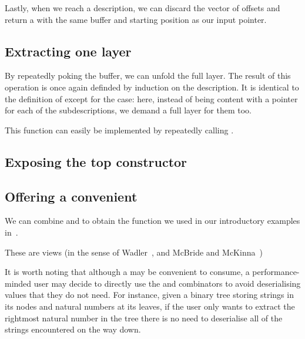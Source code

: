 
Lastly, when we reach a  description, we can discard the
vector of offsets and return a  with the same buffer
and starting position as our input pointer.

\subsection{Extracting one layer}

By repeatedly poking the buffer, we can unfold the full layer.
The result of this operation is once again definded by induction
on the description. It is identical to the definition of
 except for the  case:
here, instead of being content with a pointer for each of the
subdescriptions, we demand a full layer for them too.


This function can easily be implemented by repeatedly calling
.


\subsection{Exposing the top constructor}





\subsection{Offering a convenient }

We can combine  and  to obtain
the  function we used in our introductory examples
in~.



These are views
(in the sense of Wadler~\cite{DBLP:conf/popl/Wadler87},
and McBride and McKinna~\cite{DBLP:journals/jfp/McBrideM04})

It is worth noting that although a  may be
convenient to consume, a performance-minded user may decide to
directly use the  and 
combinators to avoid deserialising values that they do not need.
%
For instance, given a binary tree storing strings in its nodes and
natural numbers at its leaves, if the user only wants to extract the
rightmost natural number in the tree there is no need to deserialise
all of the strings encountered on the way down.

